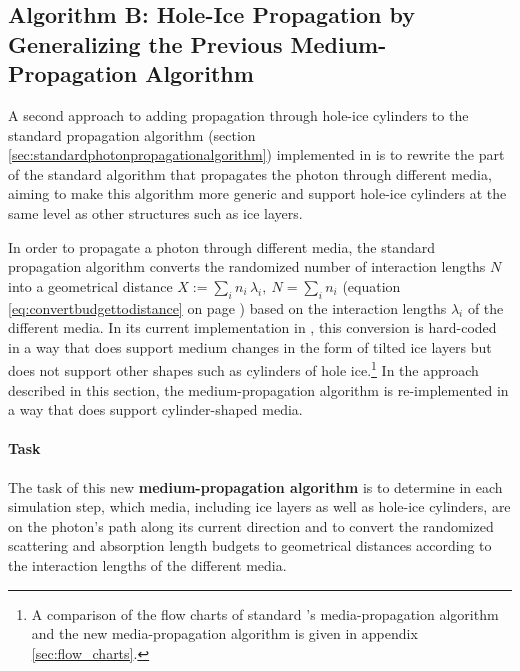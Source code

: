 \subsection{Algorithm B: Hole-Ice Propagation by Generalizing the Previous Medium-Propagation Algorithm}
\label{sec:algorithm_b}

A second approach to adding propagation through hole-ice cylinders to
the standard propagation algorithm (section
\ref{sec:standardphotonpropagationalgorithm}) implemented in \clsim is
to rewrite the part of the standard algorithm that propagates the photon
through different media, aiming to make this algorithm more generic and
support hole-ice cylinders at the same level as other structures such as
ice layers.


In order to propagate a photon through different media, the standard
propagation algorithm converts the randomized number of interaction
lengths \(N\) into a geometrical distance
\(X:=\sum_i n_i\,\lambda_i,\ N = \sum_i n_i\) (equation
\ref{eq:convertbudgettodistance} on page
\pageref{eq:convertbudgettodistance}) based on the interaction lengths
\(\lambda_i\) of the different media. In its current implementation in
\clsim, this conversion is hard-coded in a way that does support medium
changes in the form of tilted ice layers but does not support other
shapes such as cylinders of hole
ice.\footnote{A comparison of the flow charts of standard \clsim's media-propagation algorithm and the new media-propagation algorithm is given in appendix \ref{sec:flow_charts}.}
In the approach described in this section, the medium-propagation
algorithm is re-implemented in a way that does support cylinder-shaped
media.

\paragraph{Task}

The task of this new \textbf{medium-propagation algorithm} is to
determine in each simulation step, which media, including ice layers as
well as hole-ice cylinders, are on the photon's path along its current
direction and to convert the randomized scattering and absorption length
budgets to geometrical distances according to the interaction lengths of
the different media.

